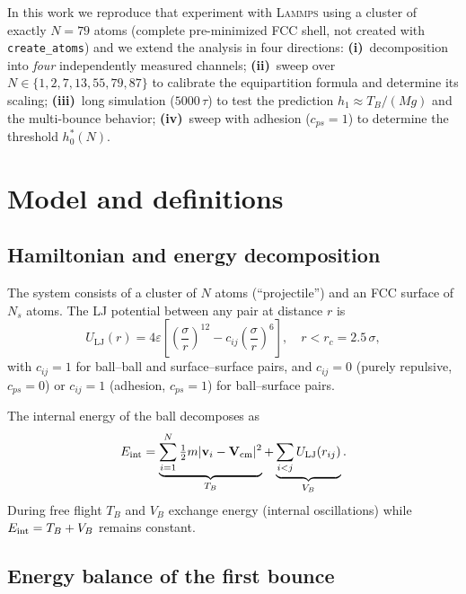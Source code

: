 \documentclass[aps,pre,twocolumn,reprint,superscriptaddress]{revtex4-2}
\newcommand{\eps}{\varepsilon}
\newcommand{\lammps}{\textsc{Lammps}}
\begin{document}
In this work we reproduce that experiment with \lammps{} using a cluster of
exactly $N=79$ atoms (complete pre-minimized FCC shell, not created with
\texttt{create\_atoms}) and we extend the analysis in four directions:
\textbf{(i)}~decomposition into \emph{four} independently measured channels;
\textbf{(ii)}~sweep over $N\in\{1,2,7,13,55,79,87\}$ to calibrate the
equipartition formula and determine its scaling;
\textbf{(iii)}~long simulation ($5000\,\tau$) to test the prediction
$h_1\approx T_B/(Mg)$ and the multi-bounce behavior;
\textbf{(iv)}~sweep with adhesion ($c_{ps}=1$) to determine the threshold
$h_0^*(N)$.

\section{Model and definitions}
\label{sec:modelo}

\subsection{Hamiltonian and energy decomposition}
\label{sec:hamiltoniano}

The system consists of a cluster of $N$ atoms (``projectile'') and an FCC
surface of $N_s$ atoms. The LJ potential between any pair at distance $r$ is
\begin{equation}
    U_{\mathrm{LJ}}(r) = 4\eps \left[ \left(\frac{\sigma}{r}\right)^{12}
    - c_{ij}\left(\frac{\sigma}{r}\right)^{6} \right],
    \quad r < r_c = 2.5\,\sigma,
    \label{eq:lj}
\end{equation}
with $c_{ij}=1$ for ball--ball and surface--surface pairs, and $c_{ij}=0$
(purely repulsive, $c_{ps}=0$) or $c_{ij}=1$ (adhesion, $c_{ps}=1$) for
ball--surface pairs.

The internal energy of the ball decomposes as
\begin{equation}
    E_{\mathrm{int}} =
    \underbrace{\sum_{i=1}^{N}\tfrac{1}{2}m|\mathbf{v}_i-\mathbf{V}_{\rm cm}|^2}_{T_B}
    +
    \underbrace{\sum_{i<j}U_{\mathrm{LJ}}(r_{ij})}_{V_B}.
    \label{eq:TB_VB}
\end{equation}
During free flight $T_B$ and $V_B$ exchange energy (internal oscillations)
while $E_{\rm int}=T_B+V_B$ remains constant.

\subsection{Energy balance of the first bounce}
\label{sec:balance}
\end{document}
